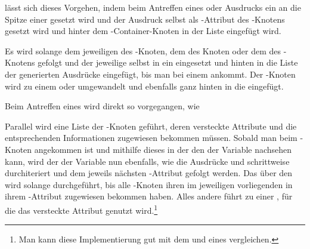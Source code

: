 
\begin{Special_Paragraph}
 lässt sich dieses Vorgehen, indem beim Antreffen eines  oder  Ausdrucks ein  an die Spitze einer  gesetzt wird und der Ausdruck selbst als -Attribut des -Knotens gesetzt wird und hinter dem -Container-Knoten in der Liste eingefügt wird.

Es wird solange dem jeweiligen  des -Knoten, dem  des  Knoten oder dem  des -Knotens gefolgt und der jeweilige  selbst in ein  eingesetzt und hinten in die Liste der generierten Ausdrücke eingefügt, bis man bei einem  ankommt. Der -Knoten wird zu einem  oder  umgewandelt und ebenfalls ganz hinten in die  eingefügt.

Beim Antreffen eines  wird direkt so vorgegangen, wie

Parallel wird eine Liste der -Knoten geführt, deren \textcolor{gray!90!black}{versteckte Attribute}  und  die entsprechenden Informationen zugewiesen bekommen müssen. Sobald man beim -Knoten angekommen ist und mithilfe dieses in der  den  der Variable nachsehen kann, wird der  der Variable nun ebenfalls, wie die Ausdrücke  und  schrittweise durchiteriert und dem jeweils nächsten -Attribut gefolgt werden. Das  über den  wird solange durchgeführt, bis alle -Knoten ihren im jeweiligen  vorliegenden  in ihrem -Attribut zugewiesen bekommen haben. Alles andere führt zu einer , für die das \textcolor{gray!90!black}{versteckte Attribut}  genutzt wird.\footnote{Man kann diese Implementierung gut mit dem  und  eines  vergleichen.}
\end{Special_Paragraph}

